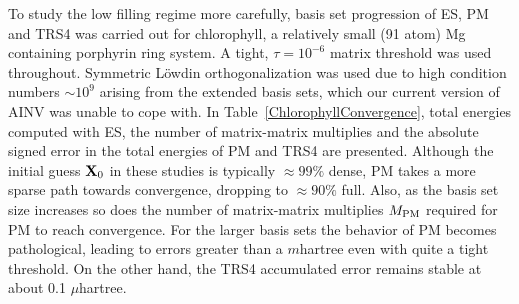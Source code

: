 \commentoutA{\documentclass[prb,aps,twocolumn,showpacs,twocolumngrid,superbib]{revtex4}}
\begin{document}
To study the low filling regime more carefully, basis set progression of ES, PM 
and TRS4 was carried out for chlorophyll, a relatively small (91 atom) Mg containing porphyrin ring system. 
A tight,  $\tau=10^{-6}$ matrix threshold was used throughout.  Symmetric L\"owdin orthogonalization 
was used due to high condition numbers $\sim 10^9$ arising from the extended basis sets, which 
our current version of AINV was unable to cope with.  In Table~\ref{ChlorophyllConvergence}, 
total energies computed with ES, the number of matrix-matrix multiplies and the absolute signed 
error in the total energies of PM and TRS4 are presented.  Although the initial guess ${\bf X}_0$ 
in these studies is typically $\approx 99\%$ dense, PM takes a more sparse path towards convergence, 
dropping to $\approx 90\%$ full.  Also, as the basis set size increases so does the number 
of matrix-matrix multiplies $M_{\rm PM}$ required for PM to reach convergence. For the 
larger basis sets the behavior of PM becomes pathological,  leading to errors greater 
than a $m$hartree even with quite a tight threshold.  On the other hand, the TRS4 accumulated error 
remains stable at about 0.1 $\mu$hartree.
\end{document}
